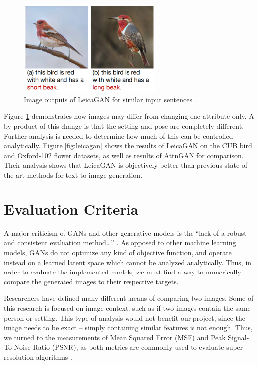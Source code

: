 \documentclass[letterpaper]{article} %
\begin{document}
\begin{figure}[htbp]
	\centerline{\includegraphics[width=7cm]{leicagan_sample.png}}
	\caption{Image outputs of LeicaGAN for similar input sentences
		\cite{leica}.}
	\label{fig:leica_sample}
\end{figure}

Figure \ref{fig:leica_sample} demonstrates how images may differ from changing 
one attribute only. A by-product of this change is that the setting and pose 
are completely different. Further analysis is needed to determine how much of 
this can be controlled analytically. Figure \ref{fig:leicagan} shows the 
results of LeicaGAN on the CUB bird and Oxford-102 flower datasets, as well as 
results of AttnGAN for comparison. Their analysis shows that LeicaGAN is 
objectively better than previous state-of-the-art methods for text-to-image 
generation.

\section{Evaluation Criteria}
A major criticism of GANs and other generative models is the
``lack of a robust and consistent evaluation method\dots''
\cite{gmm}.
As opposed to other machine learning models, GANs do not optimize any kind of 
objective function,
and operate instead on a learned latent space
which cannot be analyzed analytically.
Thus, in order to evaluate the implemented models,
we must find a way to numerically compare the generated images to their 
respective targets.

Researchers have defined many different means of comparing two images.
Some of this research is focused on image context, such as if two images 
contain the same
person or setting.
This type of analysis would not benefit our project,
since the image needs to be exact --
simply containing similar features is not enough.
Thus, we turned to the measurements of
Mean Squared Error (MSE) and Peak Signal-To-Noise Ratio (PSNR),
as both metrics are commonly used to evaluate super resolution algorithms
\cite{super_resolution}.
\end{document}
